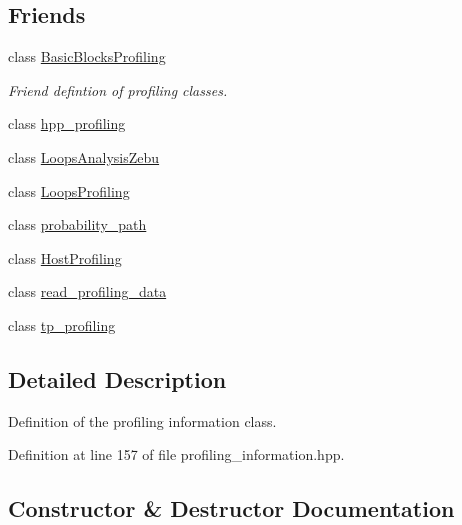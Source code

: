\subsection*{Friends}
\begin{DoxyCompactItemize}
\item 
class \hyperlink{classProfilingInformation_a87b11674e05d76b8663d6e3ac122cd8f}{Basic\+Blocks\+Profiling}
\begin{DoxyCompactList}\small\item\em Friend defintion of profiling classes. \end{DoxyCompactList}\item 
class \hyperlink{classProfilingInformation_a6a6bc099881e3be4e8f9841667053c6f}{hpp\+\_\+profiling}
\item 
class \hyperlink{classProfilingInformation_aa6518cdd209493b978849dc43dbb17a2}{Loops\+Analysis\+Zebu}
\item 
class \hyperlink{classProfilingInformation_aa0b8ea11ea1cf633a99d0bc8c7e03cbf}{Loops\+Profiling}
\item 
class \hyperlink{classProfilingInformation_a36ba7cf3661cd9e03d109c40b4873394}{probability\+\_\+path}
\item 
class \hyperlink{classProfilingInformation_aeae4f76935b7ccae2766532d8c77d884}{Host\+Profiling}
\item 
class \hyperlink{classProfilingInformation_af65e69c76a0365b3c9c52d28ec2a8661}{read\+\_\+profiling\+\_\+data}
\item 
class \hyperlink{classProfilingInformation_abd013dc605abd765cac41400b089c8b5}{tp\+\_\+profiling}
\end{DoxyCompactItemize}


\subsection{Detailed Description}
Definition of the profiling information class. 

Definition at line 157 of file profiling\+\_\+information.\+hpp.



\subsection{Constructor \& Destructor Documentation}
\mbox{\label{classProfilingInformation_a4513d68814d5f75c6461a86ced46019c}} 
